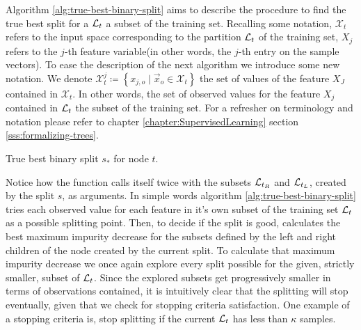Algorithm \ref{alg:true-best-binary-split} aims to describe the procedure to
find the true best split for a $\mathcal{L}_t$ a subset of the training set. Recalling
some notation, $\mathcal{X}_t$ refers to the input space corresponding to the
partition $\mathcal{L}_t$ of the training set, $X_j$ refers to the $j$-th feature
variable(in other words, the $j$-th entry on the sample vectors). To ease the
description of the next algorithm we introduce some new notation. We denote
$\mathcal{X}_{t}^{j} \coloneqq \left\{ x_{j, o} \mid \vec{x}_{o} \in
\mathcal{X}_t \right\}$ the set of values of the feature $X_J$ contained in
$\mathcal{X}_t$. In other words, the set of observed values for the feature
$X_j$ contained in $\mathcal{L}_t$ the subset of the training set. For a refresher on
terminology and notation please refer to chapter
\ref{chapter:SupervisedLearning} section \ref{sss:formalizing-trees}.

\begin{algorithm}
    \caption[True best binary split for node $t$.]{True best binary split $s_*$ for node $t$.}
    \label{alg:true-best-binary-split}
\end{algorithm}

Notice how the function \TrueBestSplit calls itself twice with the subsets
$\mathcal{L}_{t_R}$ and $\mathcal{L}_{t_L}$, created by the split $s$, as arguments. In simple words
algorithm \ref{alg:true-best-binary-split} tries each observed value for each
feature in it's own subset of the training set $\mathcal{L}_t$ as a possible splitting
point. Then, to decide if the split is good, calculates the best maximum
impurity decrease for the subsets defined by the left and right children of the
node created by the current split. To calculate that maximum impurity decrease
we once again explore every split possible for the given, strictly smaller,
subset of $\mathcal{L}_t$. Since the explored subsets get progressively smaller in terms
of observations contained, it is intuitively clear that the splitting will stop
eventually, given that we check for stopping criteria satisfaction. One example
of a stopping criteria is, stop splitting if the current $\mathcal{L}_t$ has less
than $\kappa$ samples.

